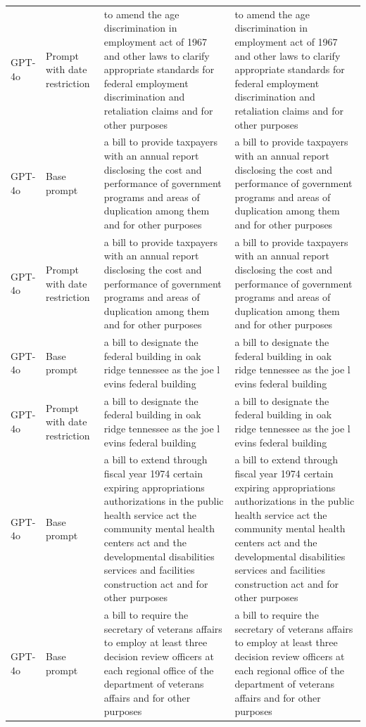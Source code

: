 \begin{longtable}{>{\raggedright\arraybackslash}p{1.4cm}>{\raggedright\arraybackslash}p{1.4cm}>{\raggedright\arraybackslash}p{5.5cm}>{\raggedright\arraybackslash}p{5.5cm}}
GPT-4o & Prompt with date restriction & to amend the age discrimination in employment act of 1967 and other laws to clarify appropriate standards for federal employment discrimination and retaliation claims and for other purposes & to amend the age discrimination in employment act of 1967 and other laws to clarify appropriate standards for federal employment discrimination and retaliation claims and for other purposes\\
GPT-4o & Base prompt & a bill to provide taxpayers with an annual report disclosing the cost and performance of government programs and areas of duplication among them and for other purposes & a bill to provide taxpayers with an annual report disclosing the cost and performance of government programs and areas of duplication among them and for other purposes\\
GPT-4o & Prompt with date restriction & a bill to provide taxpayers with an annual report disclosing the cost and performance of government programs and areas of duplication among them and for other purposes & a bill to provide taxpayers with an annual report disclosing the cost and performance of government programs and areas of duplication among them and for other purposes\\
GPT-4o & Base prompt & a bill to designate the federal building in oak ridge tennessee as the joe l evins federal building & a bill to designate the federal building in oak ridge tennessee as the joe l evins federal building\\
GPT-4o & Prompt with date restriction & a bill to designate the federal building in oak ridge tennessee as the joe l evins federal building & a bill to designate the federal building in oak ridge tennessee as the joe l evins federal building\\
GPT-4o & Base prompt & a bill to extend through fiscal year 1974 certain expiring appropriations authorizations in the public health service act the community mental health centers act and the developmental disabilities services and facilities construction act and for other purposes & a bill to extend through fiscal year 1974 certain expiring appropriations authorizations in the public health service act the community mental health centers act and the developmental disabilities services and facilities construction act and for other purposes\\
GPT-4o & Base prompt & a bill to require the secretary of veterans affairs to employ at least three decision review officers at each regional office of the department of veterans affairs and for other purposes & a bill to require the secretary of veterans affairs to employ at least three decision review officers at each regional office of the department of veterans affairs and for other purposes\\

\end{longtable}

